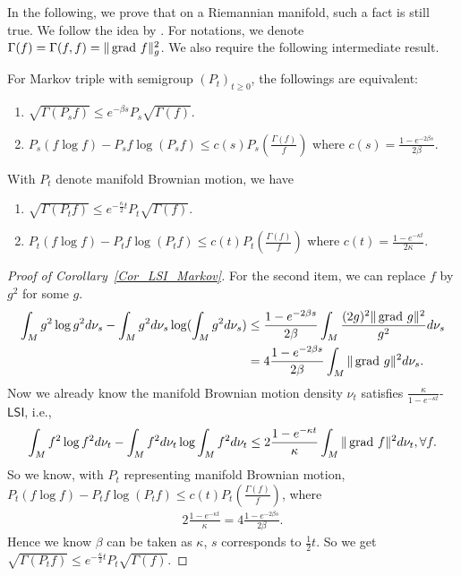 In the following, we prove that on a Riemannian manifold, such a fact is still true. 
We follow the idea by {\citet[Theorem 4.1]{collet2008logarithmic}}.
For notations, we denote $\Gamma(f) = \Gamma(f, f) = \|\operatorname{grad\,} f\|_{g}^{2}$. We also require the following intermediate result. 
\begin{lemma}    For Markov triple with semigroup $(P_{t})_{t \ge 0}$, 
    the followings are equivalent:
    \begin{enumerate}
        \item $\sqrt{\Gamma(P_{s}f)} \le e^{- \beta s} P_{s} \sqrt{\Gamma(f)}$.
        \item $ P_{s}(f \log f) -  P_{s} f \log (P_{s} f) \le c(s) P_{s} (\frac{\Gamma(f)}{f}) $ where $c(s) = \frac{1 - e^{-2\beta s}}{2\beta}$.
    \end{enumerate}
\end{lemma}
\begin{corollary}\label{Cor_LSI_Markov}
    With $P_{t}$ denote manifold Brownian motion, we have 
    \begin{enumerate}
        \item $\sqrt{\Gamma(P_{t}f)} \le e^{- \frac{\kappa}{2}t} P_{t} \sqrt{\Gamma(f)}$.
        \item $ P_{t}(f \log f) -  P_{t} f \log (P_{t} f) \le c(t) P_{t} (\frac{\Gamma(f)}{f}) $ 
        where $c(t) = \frac{1 - e^{-\kappa t}}{2\kappa}$.
    \end{enumerate}
\end{corollary}
\begin{proof}[Proof of Corollary~\ref{Cor_LSI_Markov}]
    For the second item, we can replace $f$ by $g^{2}$ for some $g$. 
    \begin{align*}
            \int_{M} g^{2} \log g^{2} d\nu_{s} - \int_{M} g^{2}d\nu_{s} \log(\int_{M} g^{2}d\nu_{s}) 
            &\le \frac{1 - e^{-2\beta s}}{2\beta} \int_{M}  \frac{(2g)^{2}\|\operatorname{grad\,} g\|^{2}}{g^{2}} d\nu_{s} \\
            &= 4\frac{1 - e^{-2\beta s}}{2\beta} \int_{M} \|\operatorname{grad\,} g\|^{2} d\nu_{s}.
    \end{align*}
    Now we already know the manifold Brownian motion density $\nu_{t}$ satisfies $\frac{\kappa}{1 - e^{-\kappa t}}$-$\mathsf{LSI}$, i.e., 
    \begin{align*}
        \int_{M} f^{2} \log f^{2} d\nu_{t} - \int_{M} f^{2} d\nu_{t} \log \int_{M} f^{2} d\nu_{t}
            \le 2\frac{1 - e^{-\kappa t}}{\kappa} \int_{M} \|\operatorname{grad\,} f\|^{2} d\nu_{t} , \forall f.
    \end{align*}
    So we know, with $P_{t}$ representing manifold Brownian motion, 
    $ P_{t}(f \log f) -  P_{t} f \log (P_{t} f) \le c(t) P_{t} (\frac{\Gamma(f)}{f})$, where 
    \begin{align*}
        2\frac{1 - e^{-\kappa t}}{\kappa} = 4\frac{1 - e^{-2\beta s}}{2\beta}.
    \end{align*}
    Hence we know $\beta$ can be taken as $\kappa$, $s$ corresponds to $\frac{1}{2}t$. 
    So we get $\sqrt{\Gamma(P_{t}f)} \le e^{- \frac{\kappa}{2}t} P_{t} \sqrt{\Gamma(f)}$.
\end{proof}

